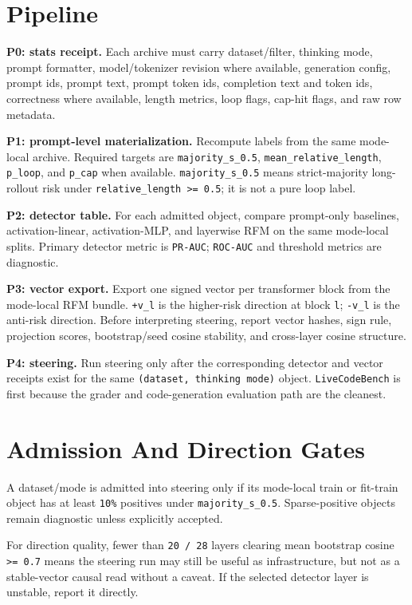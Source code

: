 \documentclass[11pt]{article}
\begin{document}
\section*{Pipeline}
\textbf{P0: stats receipt.} Each archive must carry dataset/filter, thinking
mode, prompt formatter, model/tokenizer revision where available, generation
config, prompt ids, prompt text, prompt token ids, completion text and token ids,
correctness where available, length metrics, loop flags, cap-hit flags, and raw
row metadata.

\textbf{P1: prompt-level materialization.} Recompute labels from the same
mode-local archive. Required targets are \texttt{majority\_s\_0.5},
\texttt{mean\_relative\_length}, \texttt{p\_loop}, and \texttt{p\_cap} when
available. \texttt{majority\_s\_0.5} means strict-majority long-rollout risk
under \texttt{relative\_length >= 0.5}; it is not a pure loop label.

\textbf{P2: detector table.} For each admitted object, compare prompt-only
baselines, activation-linear, activation-MLP, and layerwise RFM on the same
mode-local splits. Primary detector metric is \texttt{PR-AUC}; \texttt{ROC-AUC}
and threshold metrics are diagnostic.

\textbf{P3: vector export.} Export one signed vector per transformer block from
the mode-local RFM bundle. \texttt{+v\_l} is the higher-risk direction at block
\texttt{l}; \texttt{-v\_l} is the anti-risk direction. Before interpreting
steering, report vector hashes, sign rule, projection scores, bootstrap/seed
cosine stability, and cross-layer cosine structure.

\textbf{P4: steering.} Run steering only after the corresponding detector and
vector receipts exist for the same \texttt{(dataset, thinking mode)} object.
\texttt{LiveCodeBench} is first because the grader and code-generation
evaluation path are the cleanest.

\section*{Admission And Direction Gates}
A dataset/mode is admitted into steering only if its mode-local train or
fit-train object has at least \texttt{10\%} positives under
\texttt{majority\_s\_0.5}. Sparse-positive objects remain diagnostic unless
explicitly accepted.

For direction quality, fewer than \texttt{20 / 28} layers clearing mean
bootstrap cosine \texttt{>= 0.7} means the steering run may still be useful as
infrastructure, but not as a stable-vector causal read without a caveat. If the
selected detector layer is unstable, report it directly.
\end{document}
